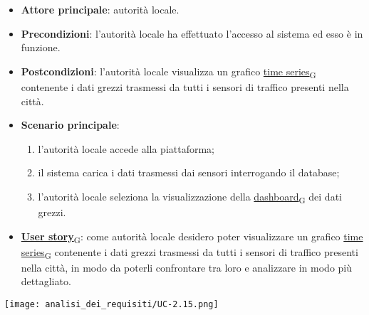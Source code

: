 \begin{itemize}
	\item \textbf{Attore principale}: autorità locale.
	\item \textbf{Precondizioni}: l'autorità locale ha effettuato l'accesso al sistema ed esso è in funzione.
	\item \textbf{Postcondizioni}: l'autorità locale visualizza un grafico \href{https://7last.github.io/docs/rtb/documentazione-interna/glossario\#time-series}{time series\textsubscript{G}} contenente i dati grezzi trasmessi da tutti i sensori
	      di traffico presenti nella città.
	\item \textbf{Scenario principale}:
	      \begin{enumerate}
		      \item l'autorità locale accede alla piattaforma;
		      \item il sistema carica i dati trasmessi dai sensori interrogando il database;
		      \item l'autorità locale seleziona la visualizzazione della \href{https://7last.github.io/docs/rtb/documentazione-interna/glossario\#dashboard}{dashboard\textsubscript{G}} dei dati grezzi.
	      \end{enumerate}
	\item \href{https://7last.github.io/docs/rtb/documentazione-interna/glossario\#user-story}{\textbf{User story}\textsubscript{G}}:
	      come autorità locale desidero poter visualizzare un grafico \href{https://7last.github.io/docs/rtb/documentazione-interna/glossario\#time-series}{time series\textsubscript{G}} contenente i dati grezzi trasmessi da tutti i sensori
	      di traffico presenti nella città, in modo da poterli confrontare tra loro e analizzare in modo più dettagliato.
\end{itemize}
\begin{center}
	\texttt{[image: analisi\_dei\_requisiti/UC-2.15.png]}
\end{center}

\newpage

